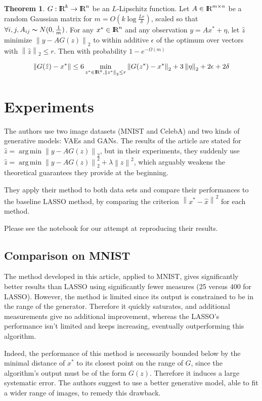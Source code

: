 \documentclass{article}
\newcommand\norm[1]{\left\lVert#1\right\rVert}
\def\R{\textrm{I\kern-0.21emR}}
\theoremstyle{definition}
\theoremstyle{lemma}
\theoremstyle{theorem}
\newtheorem{theorem}{Theorem}[section]
\DeclareMathOperator*{\argmin}{arg\,min}
\begin{document}
\begin{theorem}
 $G : \R^k \rightarrow \R^n$ be an $L$-Lipschitz function. Let $A \in \R^{m \times n}$ be a random Gaussian matrix for $m = O(k \log \frac{Lr}{\delta})$, scaled so that $\forall i,j, A_{ij} \thicksim N(0, \frac{1}{m})$. For any $x^* \in \R^n$ and any observation $y = Ax^* + \eta$, let $\hat{z}$ minimize $\norm{y - AG(z)}_2$ to within additive $\epsilon$ of the optimum over vectors with $\norm{\hat{z}}_2 \leq r$. Then with probability $1 - e^{- \Omega(m)}$
 
 $$ \norm{G(\hat{z}) - x^*} \leq 6 \min_{z^* \in \R^k, \norm{z^*}_2 \leq r} \norm{G(z^*) - x^*}_2 +3\norm{\eta}_2 + 2\epsilon + 2\delta$$
 
\end{theorem}



\section{Experiments}

The authors use two image datasets (MNIST and CelebA) and two kinds of generative models: VAEs and GANs. The results of the article are stated for $ \hat{z} = \argmin \norm{y - AG(z)}_2$, but in their experiments, they suddenly use $ \hat{z} = \argmin \norm{y - AG(z)}_2^2 + \lambda \norm{z}^2$, which arguably weakens the theoretical guarantees they provide at the beginning.

They apply their method to both data sets and compare their performances to the baseline LASSO method, by comparing the criterion $\norm{x^* - \hat{x}}^2$ for each method.

Please see the notebook for our attempt at reproducing their results.

\subsection{Comparison on MNIST}
The method developed in this article, applied to MNIST, gives significantly better results than LASSO using significantly fewer measures (25 versus 400 for LASSO). However, the method is limited since its output is constrained to be in the range of the generator. Therefore it quickly saturates, and additional measurements give no additional improvement, whereas the LASSO's performance isn't limited and keeps increasing, eventually outperforming this algorithm.

Indeed, the performance of this method is necessarily bounded below by the minimal distance of $x^*$ to its closest point on the range of $G$, since the algorithm's output must be of the form $G(z)$. Therefore it induces a large systematic error. The authors suggest to use a better generative model, able to fit a wider range of images, to remedy this drawback.
\end{document}
